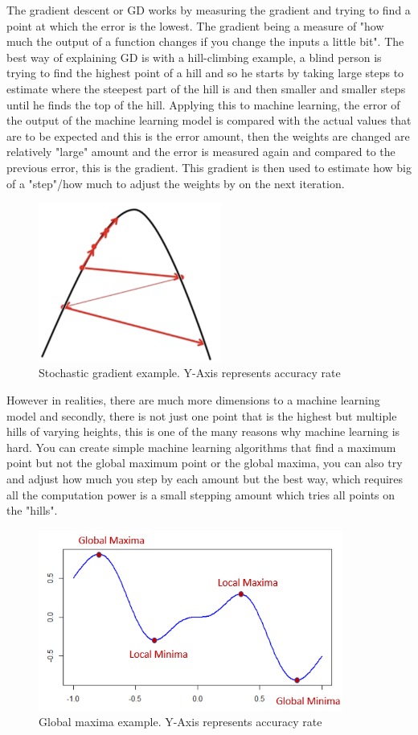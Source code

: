 \documentclass[a4paper,oneside,phd,etd]{BYUPhys}
\begin{document}
The gradient descent or GD works by measuring the gradient and trying to find a point at which the error is the lowest. The gradient being a measure of "how much the output of a function changes if you change the inputs a little bit"\cite{towards-data-science}.
The best way of explaining GD is with a hill-climbing example, a blind person is trying to find the highest point of a hill and so he starts by taking large steps to estimate where the steepest part of the hill is and then smaller and smaller steps until he finds the top of the hill. Applying this to machine learning, the error of the output of the machine learning model is compared with the actual values that are to be expected and this is the error amount, then the weights are changed are relatively "large" amount and the error is measured again and compared to the previous error, this is the gradient. This gradient is then used to estimate how big of a "step"/how much to adjust the weights by on the next iteration.
\begin{figure}[H]
\centering
\includegraphics[width=6cm]{pictures/gradient.png}
\caption{Stochastic gradient example.
Y-Axis represents accuracy rate}
\label{fig:gradient}
\end{figure}

However in realities, there are much more dimensions to a machine learning model and secondly, there is not just one point that is the highest but multiple hills of varying heights, this is one of the many reasons why machine learning is hard. You can create simple machine learning algorithms that find a maximum point but not the global maximum point or the global maxima, you can also try and adjust how much you step by each amount but the best way, which requires all the computation power is a small stepping amount which tries all points on the "hills". 
\begin{figure}[H]
\centering
\includegraphics[width=10cm]{pictures/global_minima.png}
\caption{Global maxima example.
Y-Axis represents accuracy rate}
\label{fig:global_minima}
\end{figure}
\end{document}
